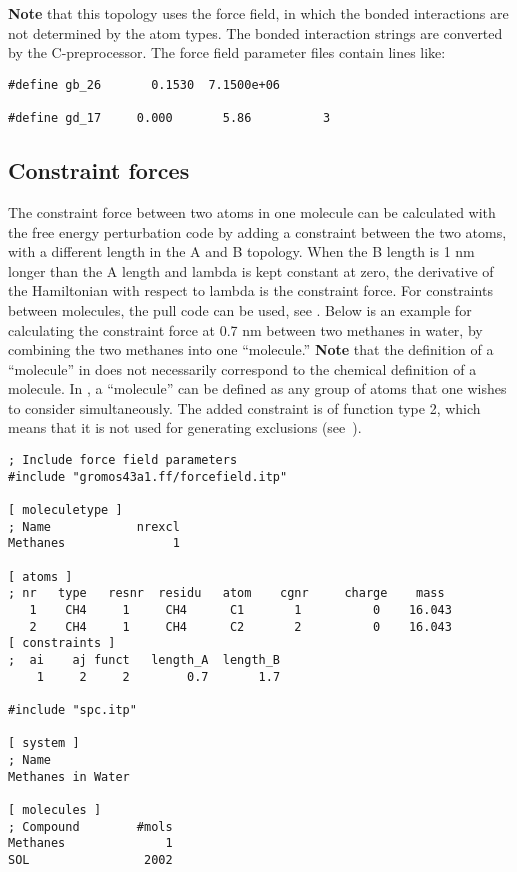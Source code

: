 {\bf Note} that this topology uses the  force field, in which the bonded
interactions are not determined by the atom types. The bonded interaction
strings are converted by the C-preprocessor. The force field parameter
files contain lines like:

{\small
\begin{verbatim}
#define gb_26       0.1530  7.1500e+06

#define gd_17     0.000       5.86          3
\end{verbatim}}

\subsection{Constraint forces}
\label{subsec:constraintforce}
The constraint force between two atoms in one molecule can be calculated
with the free energy perturbation code by adding a constraint between the
two atoms, with a different length in the A and B topology. When the B length
is 1 nm longer than the A length and lambda is kept constant at zero,
the derivative of the Hamiltonian with respect to lambda is the constraint
force. For constraints between molecules, the pull code can be used,
see .
Below is an example for calculating the constraint force at 0.7 nm
between two methanes in water, by combining the two methanes into one ``molecule.''
{\bf Note} that the definition of a ``molecule'' in {\gromacs} does not necessarily
correspond to the chemical definition of a molecule.  In {\gromacs}, a ``molecule''
can be defined as any group of atoms that one wishes to consider simultaneously.
The added constraint is of function type 2, which means that it is not
used for generating exclusions (see~).\\

{\small
\begin{verbatim}
; Include force field parameters
#include "gromos43a1.ff/forcefield.itp"

[ moleculetype ]
; Name            nrexcl
Methanes               1

[ atoms ]
; nr   type   resnr  residu   atom    cgnr     charge    mass
   1    CH4     1     CH4      C1       1          0    16.043
   2    CH4     1     CH4      C2       2          0    16.043
[ constraints ]
;  ai    aj funct   length_A  length_B
    1     2     2        0.7       1.7

#include "spc.itp"

[ system ]
; Name
Methanes in Water

[ molecules ]
; Compound        #mols
Methanes              1
SOL                2002
\end{verbatim}}

